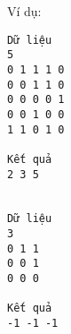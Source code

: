 Ví dụ:
\begin{verbatim}
Dữ liệu
5
0 1 1 1 0
0 0 1 1 0
0 0 0 0 1
0 0 1 0 0
1 1 0 1 0

Kết quả
2 3 5


Dữ liệu
3
0 1 1
0 0 1
0 0 0

Kết quả
-1 -1 -1
\end{verbatim}